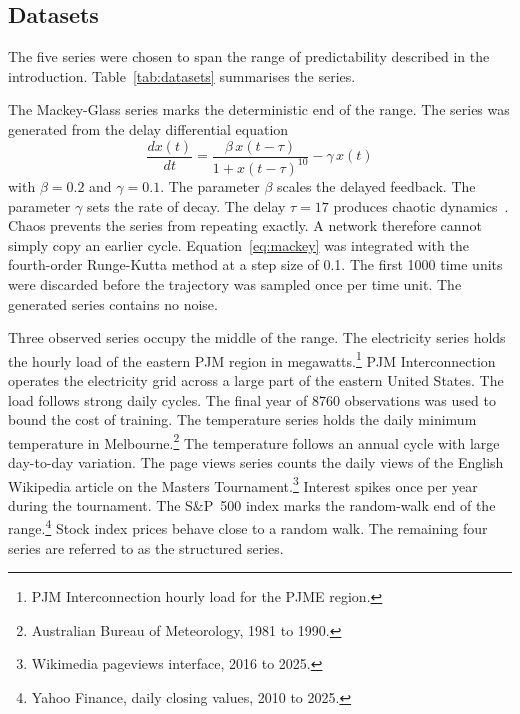 \documentclass[conference,10pt]{IEEEtran}
\begin{document}
\subsection{Datasets}

The five series were chosen to span the range of predictability
described in the introduction.
Table~\ref{tab:datasets} summarises the series.



The Mackey-Glass series marks the deterministic end of the range.
The series was generated from the delay differential
equation~\cite{mackey1977}
\begin{equation}
\frac{dx(t)}{dt} = \frac{\beta\, x(t-\tau)}{1 + x(t-\tau)^{10}}
- \gamma\, x(t)
\label{eq:mackey}
\end{equation}
with $\beta = 0.2$ and $\gamma = 0.1$.
The parameter $\beta$ scales the delayed feedback.
The parameter $\gamma$ sets the rate of decay.
The delay $\tau = 17$ produces chaotic dynamics~\cite{mackey1977}.
Chaos prevents the series from repeating exactly.
A network therefore cannot simply copy an earlier cycle.
Equation~\eqref{eq:mackey} was integrated with the fourth-order
Runge-Kutta method at a step size of 0.1.
The first 1000 time units were discarded before the trajectory was
sampled once per time unit.
The generated series contains no noise.

Three observed series occupy the middle of the range.
The electricity series holds the hourly load of the eastern PJM region
in megawatts.\footnote{PJM Interconnection hourly load for the PJME
region.}
PJM Interconnection operates the electricity grid across a large part of
the eastern United States.
The load follows strong daily cycles.
The final year of 8760 observations was used to bound the cost of
training.
The temperature series holds the daily minimum temperature in
Melbourne.\footnote{Australian Bureau of Meteorology, 1981 to 1990.}
The temperature follows an annual cycle with large day-to-day
variation.
The page views series counts the daily views of the English Wikipedia
article on the Masters Tournament.\footnote{Wikimedia pageviews
interface, 2016 to 2025.}
Interest spikes once per year during the tournament.
The S\&P~500 index marks the random-walk end of the range.\footnote{Yahoo
Finance, daily closing values, 2010 to 2025.}
Stock index prices behave close to a random walk.
The remaining four series are referred to as the structured series.
\end{document}
